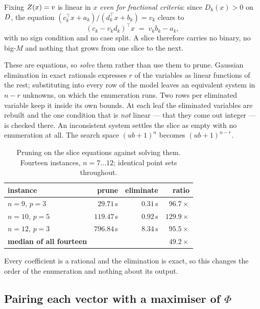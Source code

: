 \documentclass[11pt,a4paper]{article}
\begin{document}
Fixing $Z(x) = v$ is linear in $x$ \emph{even for fractional criteria}: since
$D_k(x) > 0$ on $D$, the equation
$(c_k^{\top}x + a_k)/(d_k^{\top}x + b_k) = v_k$ clears to
\begin{equation}\label{eq:slice}
  (c_k - v_k d_k)^{\top} x \;=\; v_k b_k - a_k ,
\end{equation}
with no sign condition and no case split.  A slice therefore carries no binary,
no big-$M$ and nothing that grows from one slice to the next.

These are equations, so \emph{solve} them rather than use them to prune.
Gaussian elimination in exact rationals expresses $r$ of the variables as
linear functions of the rest; substituting into every row of the model leaves
an equivalent system in $n - r$ unknowns, on which the enumeration runs.  Two
rows per eliminated variable keep it inside its own bounds.  At each leaf the
eliminated variables are rebuilt and the one condition that is \emph{not}
linear --- that they come out integer --- is checked there.  An inconsistent
system settles the slice as empty with no enumeration at all.  The search space
$(ub+1)^{n}$ becomes $(ub+1)^{n-r}$.

\begin{table}[h]
\centering
\caption{Pruning on the slice equations against solving them.  Fourteen
instances, $n = 7 \dots 12$; identical point sets throughout.}
\label{tab:elim}
\begin{tabular}{lrrr}
\toprule
instance & prune & eliminate & ratio \\
\midrule
$n=9$, $p=3$  & $29.71$\,s  & $0.31$\,s & $96.7\times$ \\
$n=10$, $p=5$ & $119.47$\,s & $0.92$\,s & $129.9\times$ \\
$n=12$, $p=3$ & $796.84$\,s & $8.34$\,s & $95.5\times$ \\
\midrule
\textbf{median of all fourteen} & & & $\mathbf{49.2\times}$ \\
\bottomrule
\end{tabular}
\end{table}

\noindent
Every coefficient is a rational and the elimination is exact, so this changes
the order of the enumeration and nothing about its output.

\subsection{\texorpdfstring{Pairing each vector with a maximiser of $\Phi$}{Pairing each vector with a maximiser of Phi}}
\end{document}
